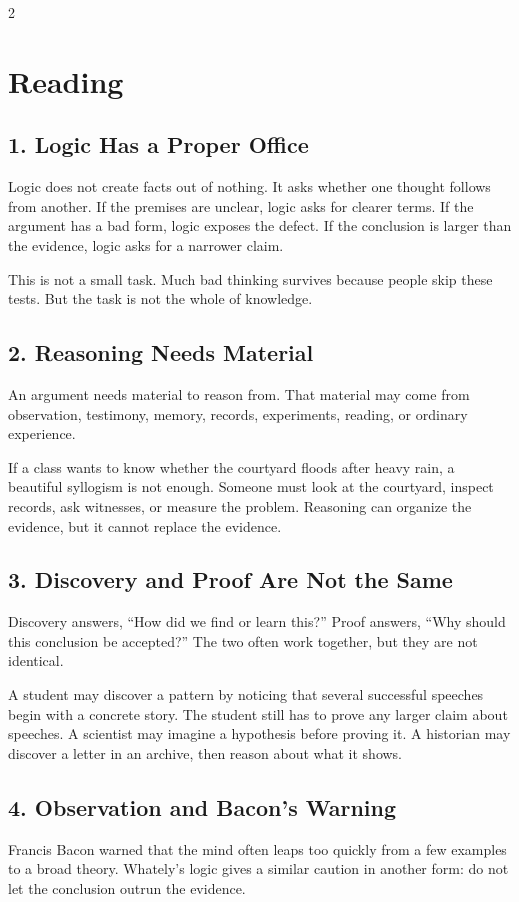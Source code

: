 \documentclass[12pt]{article}
\begin{document}
\begin{multicols}{2}
\section*{Reading}

\subsection*{1. Logic Has a Proper Office}
Logic does not create facts out of nothing. It asks whether one thought follows from another. If the premises are unclear, logic asks for clearer terms. If the argument has a bad form, logic exposes the defect. If the conclusion is larger than the evidence, logic asks for a narrower claim.

This is not a small task. Much bad thinking survives because people skip these tests. But the task is not the whole of knowledge.

\subsection*{2. Reasoning Needs Material}
An argument needs material to reason from. That material may come from observation, testimony, memory, records, experiments, reading, or ordinary experience.

If a class wants to know whether the courtyard floods after heavy rain, a beautiful syllogism is not enough. Someone must look at the courtyard, inspect records, ask witnesses, or measure the problem. Reasoning can organize the evidence, but it cannot replace the evidence.

\subsection*{3. Discovery and Proof Are Not the Same}
Discovery answers, ``How did we find or learn this?'' Proof answers, ``Why should this conclusion be accepted?'' The two often work together, but they are not identical.

A student may discover a pattern by noticing that several successful speeches begin with a concrete story. The student still has to prove any larger claim about speeches. A scientist may imagine a hypothesis before proving it. A historian may discover a letter in an archive, then reason about what it shows.

\subsection*{4. Observation and Bacon's Warning}
Francis Bacon warned that the mind often leaps too quickly from a few examples to a broad theory. Whately's logic gives a similar caution in another form: do not let the conclusion outrun the evidence.


\end{multicols}
\end{document}
